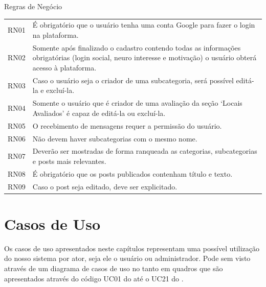 \begin{quadro}[htb]
	\centering
	\ABNTEXfontereduzida
	\caption[Regras de Negócio]{Regras de Negócio}
	\label{regra-negocio}
	\begin{tabular}{|p{3.3cm}|p{10.3cm}|}
		\hline
		\thead{Código} & \thead{Regra de negócio} \\
		\hline
		RN01 & É obrigatório que o usuário tenha uma conta Google para fazer o login na plataforma. \\
		\hline
		RN02 & Somente após finalizado o cadastro contendo todas as informações obrigatórias (login social, neuro interesse e motivação) o usuário obterá acesso à plataforma.\\
		\hline
		RN03 & Caso o usuário seja o criador de uma subcategoria, será possível editá-la e excluí-la.  \\
		\hline
		RN04 & Somente o usuário que é criador de uma avaliação da seção ‘Locais Avaliados’ é capaz de editá-la ou excluí-la. \\
		\hline
		RN05 & O recebimento de mensagens requer a permissão do usuário. \\
		\hline
		RN06 & Não devem haver subcategorias com o mesmo nome. \\
		\hline
		RN07 & Deverão ser mostradas de forma ranqueada as categorias, subcategorias e posts mais relevantes.\\
		\hline
		RN08 & É obrigatório que os posts publicados contenham título e texto.\\
		\hline
		RN09 & Caso o post seja editado, deve ser explicitado.\\
		\hline
	\end{tabular}
\end{quadro}\pagebreak

\section{Casos de Uso}
Os casos de uso apresentados neste capítulos representam uma possível utilização do nosso sistema por ator, seja ele o usuário ou administrador. Pode sem visto através de um diagrama de casos de uso no  tanto em quadros que são apresentados através do código UC01 do   até o UC21 do  . \\




